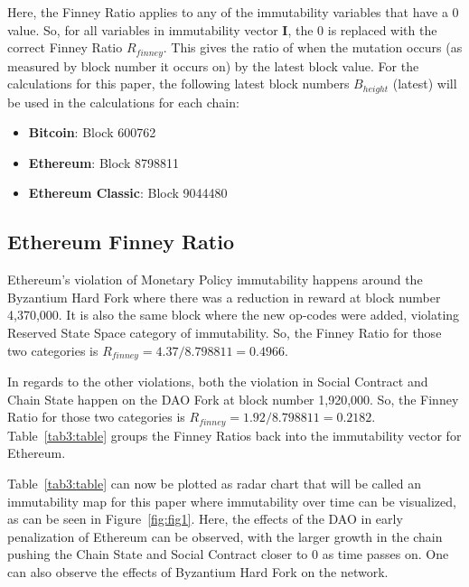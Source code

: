 \documentclass{article}
\begin{document}
Here, the Finney Ratio applies to any of the immutability variables that have a 0 value. So, for all variables in immutability vector \textbf{I}, the 0 is replaced with the correct Finney Ratio $R_{finney}$. This gives the ratio of when the mutation occurs (as measured by block number it occurs on) by the latest block value. For the calculations for this paper, the following latest block numbers $B_{height}$ (latest) will be used in the calculations for each chain:

\begin{itemize}
\item \textbf{Bitcoin}: Block 600762
\item \textbf{Ethereum}: Block 8798811
\item \textbf{Ethereum Classic}: Block 9044480
\end{itemize}

\subsection{Ethereum Finney Ratio}
Ethereum’s violation of Monetary Policy immutability happens around the Byzantium Hard Fork where there was a reduction in reward at block number 4,370,000\cite{eip649}. It is also the same block where the new op-codes were added\cite{byzantium}, violating Reserved State Space category of immutability. So, the Finney Ratio for those two categories is $R_{finney} = 4.37 / 8.798811 = 0.4966$.

In regards to the other violations, both the violation in Social Contract and Chain State happen on the DAO Fork at block number 1,920,000\cite{daofork}. So, the Finney Ratio for those two categories is $R_{finney} = 1.92 / 8.798811 = 0.2182$. Table~\ref{tab3:table} groups the Finney Ratios back into the immutability vector for Ethereum. 

Table~\ref{tab3:table} can now be plotted as radar chart that will be called an immutability map for this paper where immutability over time can be visualized, as can be seen in Figure~\ref{fig:fig1}. Here, the effects of the DAO in early penalization of Ethereum can be observed, with the larger growth in the chain pushing the Chain State and Social Contract closer to 0 as time passes on. One can also observe the effects of Byzantium Hard Fork on the network.
\end{document}
